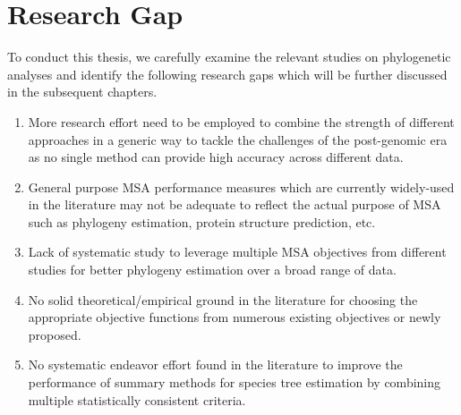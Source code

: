 \section{Research Gap}
To conduct this thesis, we carefully examine the relevant studies on phylogenetic analyses and identify the following research gaps which will be further discussed in the subsequent chapters.
\begin{enumerate}
	\item  More research effort need to be employed to combine the strength of different approaches in a generic way to tackle the challenges of the post-genomic era as no single method can provide high accuracy across different data.
	
	
	\item  General purpose MSA performance measures which are currently widely-used in the literature may not be adequate to reflect the actual purpose of MSA such as phylogeny estimation, protein structure prediction, etc.
	
	
	\item  Lack of systematic study to leverage multiple MSA objectives from different studies for better phylogeny estimation over a broad range of data.
	
	
	\item  No solid theoretical/empirical ground in the literature for choosing the appropriate objective functions from numerous existing objectives  or newly proposed.
	
	
	\item No systematic endeavor effort found in the literature to improve the performance of summary methods for species tree estimation by combining multiple statistically consistent criteria.
\end{enumerate}


